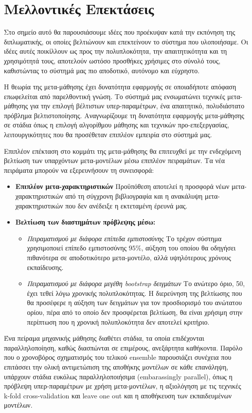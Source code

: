 \chapter{Μελλοντικές Επεκτάσεις}
Στο σημείο αυτό θα παρουσιάσουμε ιδέες που προέκυψαν κατά την εκπόνηση της διπλωματικής, οι οποίες βελτιώνουν και επεκτείνουν το σύστημα που υλοποιήσαμε. Οι ιδέες αυτές ποικίλλουν ως προς την πολυπλοκότητα, την απαιτητικότητα και τη χρησιμότητά τους, αποτελούν ωστόσο προσθήκες χρήσιμες στο σύνολό τους, καθιστώντας το σύστημά μας πιο αποδοτικό, αυτόνομο και εύχρηστο.

Η θεωρία της μετα-μάθησης έχει δυνατότητα εφαρμογής σε οποιαδήποτε απόφαση επωφελείται από παρελθοντική γνώση. Το σύστημά μας ενσωματώνει τεχνικές μετα-μάθησης για την επιλογή βέλτιστων υπερ-παραμέτρων, ένα απαιτητικό, πολυδιάστατο πρόβλημα βελτιστοποίησης. Αναγνωρίζουμε τη δυνατότητα εφαρμογής μετα-μάθησης σε στάδια όπως η επιλογή αλγορίθμου μάθησης και τεχνικών προ-επεξεργασίας, λειτουργικότητες που θα προσέθεταν επιπλέον εμπειρία στο σύστημά μας. 

Επιπλέον επέκταση στο κομμάτι της μετα-μάθησης θα επιτευχθεί με την ενδεχόμενη βελτίωση των υπαρχόντων μετα-μοντέλων μέσω επιπλέον πειραμάτων. Τα νέα πειράματα μπορούν να εξερευνήσουν τη συνεισφορά:
\begin{itemize}
	\item \textbf{Επιπλέον μετα-χαρακτηριστικών} Προϋπόθεση αποτελεί η προσφορά νέων μετα-χαρα\-κτηριστικών από τη σύγχρονη βιβλιογραφία και η ανακάλυψη μετα-χαρακτηριστικών που δεν ανέδειξε η εκτεταμένη έρευνά μας.
	\item \textbf{Βελτίωση των διαστημάτων πρόβλεψης μέσω:}
	\begin{itemize}
		\item \textit{Πειραματισμού με διάφορα επίπεδα εμπιστοσύνης} Το τρέχον σύστημα χρησιμοποιεί επίπεδο εμπιστοσύνης $95\%$, αύξηση του οποίου θα οδηγήσει πιθανότερα σε αποδοτικότερο μετα-μοντέλο, αλλά υψηλότερους χρόνους εκπαίδευσης.
		\item \textit{Πειραματισμού με διάφορα μεγέθη bootstrap δειγμάτων} Το ανώτερο όριο, 50, έχει τεθεί λόγω χρονικής πολυπλοκότητας. Η διερεύνηση της βελτίωσης που θα προσέφερε η αύξηση των δειγμάτων για τον προσδιορισμό του ανώτατου ορίου, πέρα από το οποίο δεν προσφέρεται βελτίωση, θα είναι χρήσιμη στην περίπτωση που η χρονική πολυπλοκότητα δεν αποτελεί κριτήριο.
	\end{itemize} 
\end{itemize}

Ένα πείραμα μηχανικής μάθησης διαθέτει στάδια, τα οποία επιδέχονται παραλληλοποίηση, καθώς διασπώνται σε επιμέρους, ανεξάρτητα καθήκοντα. Παρόλο που ο χρονοβόρος σχηματισμός του τελικού ensemble παρουσιάζει συνέχεια που επιτάσσει την ολική αντιμετώπιση της αποθήκης μοντέλων σε κάθε επανάληψη, υπάρχουν στάδια ευκόλως παραλληλοποιήσιμα (embarassingly parallel), όπως η πρόβλεψη υπερ-παραμέτρων με χρήση μετα-μοντέλων, η αξιολόγηση με τις τεχνικές k-fold cross-validation και leave one out και η αποθήκευση των εκπαιδευμένων μοντέλων.

